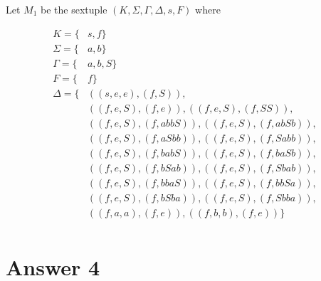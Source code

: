 \documentclass[12pt]{article}
\begin{document}
\begin{center}
    Let $M_1$ be the sextuple $(K, \Sigma, \Gamma, \Delta, s, F)$ where
\end{center}
\begin{align*}
    K = \{&s, f\} \\
    \Sigma = \{&a, b\} \\
    \Gamma = \{&a, b, S\} \\
    F = \{&f\} \\
    \Delta = \{&((s, e, e),(f, S)), \\
    &((f, e, S),(f, e)), ((f, e, S),(f, SS)), \\
    &((f, e, S),(f, abbS)), ((f, e, S),(f, abSb)), \\
    &((f, e, S),(f, aSbb)), ((f, e, S),(f, Sabb)), \\
    &((f, e, S),(f, babS)), ((f, e, S),(f, baSb)), \\
    &((f, e, S),(f, bSab)), ((f, e, S),(f, Sbab)), \\
    &((f, e, S),(f, bbaS)), ((f, e, S),(f, bbSa)), \\
    &((f, e, S),(f, bSba)), ((f, e, S),(f, Sbba)), \\
    &((f, a, a),(f, e)), ((f, b, b),(f, e))\} \\
\end{align*}

\begin{figure}[ht]
\centering
{}
\end{figure}

\newpage

\section*{Answer 4}
\end{document}

